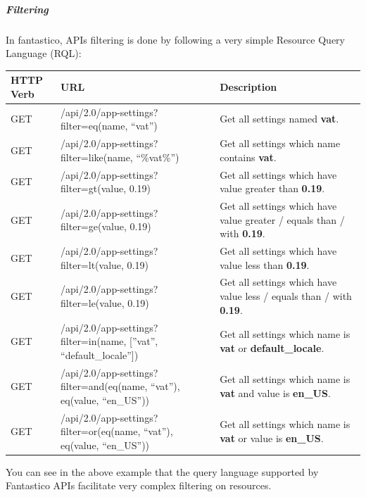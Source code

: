 \documentclass[letterpaper,10pt,english]{sphinxmanual}
\begin{document}
\subparagraph{Filtering}
\label{features/roa/rest_standard:roa-filtering}\label{features/roa/rest_standard:filtering}
In fantastico, APIs filtering is done by following a very simple Resource Query Language (RQL):

\begin{tabulary}{\linewidth}{|L|L|L|}
\hline

\textbf{HTTP Verb}
 & 
\textbf{URL}
 & 
\textbf{Description}
\\\hline

GET
 & 
/api/2.0/app-settings?filter=eq(name, ``vat'')
 & 
Get all settings named \textbf{vat}.
\\\hline

GET
 & 
/api/2.0/app-settings?filter=like(name, ``\%vat\%'')
 & 
Get all settings which name contains \textbf{vat}.
\\\hline

GET
 & 
/api/2.0/app-settings?filter=gt(value, 0.19)
 & 
Get all settings which have value greater than \textbf{0.19}.
\\\hline

GET
 & 
/api/2.0/app-settings?filter=ge(value, 0.19)
 & 
Get all settings which have value greater / equals than / with \textbf{0.19}.
\\\hline

GET
 & 
/api/2.0/app-settings?filter=lt(value, 0.19)
 & 
Get all settings which have value less than \textbf{0.19}.
\\\hline

GET
 & 
/api/2.0/app-settings?filter=le(value, 0.19)
 & 
Get all settings which have value less / equals than / with \textbf{0.19}.
\\\hline

GET
 & 
/api/2.0/app-settings?filter=in(name, {[}''vat'', ``default\_locale''{]})
 & 
Get all settings which name is \textbf{vat} or \textbf{default\_locale}.
\\\hline

GET
 & 
/api/2.0/app-settings?filter=and(eq(name, ``vat''), eq(value, ``en\_US''))
 & 
Get all settings which name is \textbf{vat} and value is \textbf{en\_US}.
\\\hline

GET
 & 
/api/2.0/app-settings?filter=or(eq(name, ``vat''), eq(value, ``en\_US''))
 & 
Get all settings which name is \textbf{vat} or value is \textbf{en\_US}.
\\\hline
\end{tabulary}


You can see in the above example that the query language supported by Fantastico APIs facilitate very complex filtering on resources.
\end{document}
